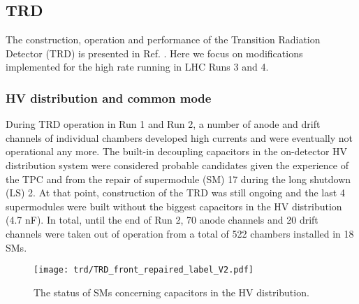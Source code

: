 \subsection{TRD}

The construction, operation and performance of the Transition Radiation Detector (TRD) is presented in Ref. \cite{Acharya:2017lco}. Here we focus on modifications implemented for the high rate running in LHC Runs 3 and 4.

\subsubsection{HV distribution and common mode}

During TRD operation in Run 1 and Run 2, a number of anode and drift channels of individual chambers developed high currents and were eventually not operational any more. The built-in decoupling capacitors in the on-detector HV distribution system were considered probable candidates given the experience of the TPC and from the repair of supermodule (SM) 17 during the long shutdown (LS) 2. At that point, construction of the TRD was still ongoing and the last 4 supermodules were built without the biggest capacitors in the HV distribution (4.7 nF). In total, until the end of Run 2, 70 anode channels and 20 drift channels were taken out of operation from a total of 522 chambers installed in 18 SMs.

\begin{figure}[hbt]
    \centering
    \texttt{[image: trd/TRD\_front\_repaired\_label\_V2.pdf]}
    \caption{The status of SMs concerning capacitors in the HV distribution.}
    \label{fig:TRD_status}
\end{figure}

